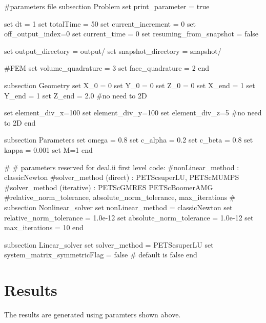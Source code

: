 \begin{DoxyCode}
\textcolor{preprocessor}{#parameters file}
\textcolor{preprocessor}{}
subsection Problem
set print\_parameter = \textcolor{keyword}{true}

set dt = 1
set totalTime = 50
set current\_increment = 0
set off\_output\_index=0
set current\_time = 0
set resuming\_from\_snapshot = \textcolor{keyword}{false}

set output\_directory = output/
set snapshot\_directory = snapshot/

\textcolor{preprocessor}{#FEM}
\textcolor{preprocessor}{}set volume\_quadrature = 3 
set face\_quadrature = 2 
end

subsection Geometry
set X\_0 = 0
set Y\_0 = 0
set Z\_0 = 0
set X\_end = 1 
set Y\_end = 1
set Z\_end = 2.0 #no need to 2D

set element\_div\_x=100
set element\_div\_y=100
set element\_div\_z=5 #no need to 2D
end

subsection Parameters
set omega = 0.8
set c\_alpha = 0.2
set c\_beta = 0.8
set kappa = 0.001
set M=1
end
                        
\textcolor{preprocessor}{#}
\textcolor{preprocessor}{}\textcolor{preprocessor}{# parameters reserved for deal.ii first level code:}
\textcolor{preprocessor}{}\textcolor{preprocessor}{#nonLinear\_method : classicNewton}
\textcolor{preprocessor}{}\textcolor{preprocessor}{#solver\_method (direct) : PETScsuperLU, PETScMUMPS}
\textcolor{preprocessor}{}\textcolor{preprocessor}{#solver\_method (iterative) : PETScGMRES PETScBoomerAMG}
\textcolor{preprocessor}{}\textcolor{preprocessor}{#relative\_norm\_tolerance, absolute\_norm\_tolerance, max\_iterations}
\textcolor{preprocessor}{}\textcolor{preprocessor}{#}
\textcolor{preprocessor}{}subsection Nonlinear\_solver
        set nonLinear\_method = classicNewton
        set relative\_norm\_tolerance = 1.0e-12
        set absolute\_norm\_tolerance = 1.0e-12
        set max\_iterations = 10
end
                        
subsection Linear\_solver
        set solver\_method = PETScsuperLU
        set system\_matrix\_symmetricFlag = \textcolor{keyword}{false} # \textcolor{keywordflow}{default} is \textcolor{keyword}{false}
end
\end{DoxyCode}
\hypertarget{growth_results}{}\section{Results}\label{growth_results}
The results are generated using paramters shown above.

  